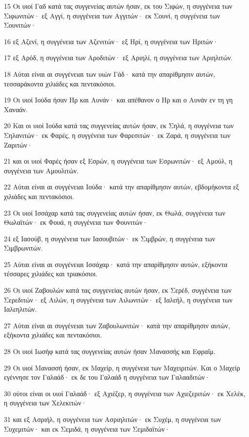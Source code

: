 \par 15 Οι υιοί Γαδ κατά τας συγγενείας αυτών ήσαν, εκ του Σιφών, η συγγένεια των Σιφωνιτών· εξ Αγγί, η συγγένεια των Αγγιτών· εκ Σουνί, η συγγένεια των Σουνιτών·
\par 16 εξ Αζενί, η συγγένεια των Αζενιτών· εξ Ηρί, η συγγένεια των Ηριτών·
\par 17 εξ Αρόδ, η συγγένεια των Αροδιτών· εξ Αριηλί, η συγγένεια των Αριηλιτών.
\par 18 Αύται είναι αι συγγένειαι των υιών Γάδ· κατά την απαρίθμησιν αυτών, τεσσαράκοντα χιλιάδες και πεντακόσιοι.
\par 19 Οι υιοί Ιούδα ήσαν Ηρ και Αυνάν· και απέθανον ο Ηρ και ο Αυνάν εν τη γη Χαναάν.
\par 20 Και οι υιοί Ιούδα κατά τας συγγενείας αυτών ήσαν, εκ Σηλά, η συγγένεια των Σηλανιτών· εκ Φαρές, η συγγένεια των Φαρεσιτών· εκ Ζαρά, η συγγένεια των Ζαριτών·
\par 21 και οι υιοί Φαρές ήσαν εξ Εσρών, η συγγένεια των Εσρωνιτών· εξ Αμούλ, η συγγένεια των Αμουλιτών.
\par 22 Αύται είναι αι συγγένειαι Ιούδα· κατά την απαρίθμησιν αυτών, εβδομήκοντα εξ χιλιάδες και πεντακόσιοι.
\par 23 Οι υιοί Ισσάχαρ κατά τας συγγενείας αυτών ήσαν, εκ Θωλά, συγγένεια των Θωλαϊτών· εκ Φουά, η συγγένεια των Φουνιτών·
\par 24 εξ Ιασούβ, η συγγένεια των Ιασουβιτών· εκ Σιμβρών, η συγγένεια των Σιμβρωνιτών.
\par 25 Αύται είναι αι συγγένειαι Ισσάχαρ· κατά την απαρίθμησιν αυτών, εξήκοντα τέσσαρες χιλιάδες και τριακόσιοι.
\par 26 Οι υιοί Ζαβουλών κατά τας συγγενείας αυτών ήσαν, εκ Σερέδ, συγγένεια των Σερεδιτών· εξ Αιλών, η συγγένεια των Αιλωνιτών· εξ Ιαλεήλ, η συγγένεια των Ιαλεηλιτών.
\par 27 Αύται είναι αι συγγένειαι των Ζαβουλωνιτών· κατά την απαρίθμησιν αυτών, εξήκοντα χιλιάδες και πεντακόσιοι.
\par 28 Οι υιοί Ιωσήφ κατά τας συγγενείας αυτών ήσαν Μανασσής και Εφραΐμ.
\par 29 Οι υιοί Μανασσή ήσαν, εκ Μαχείρ, η συγγένεια των Μαχειριτών. Και ο Μαχείρ εγέννησε τον Γαλαάδ· εκ δε του Γαλαάδ η συγγένεια των Γαλααδιτών·
\par 30 ούτοι είναι οι υιοί Γαλαάδ· εξ Αχιέζερ, η συγγένεια των Αχιεζεριτών· εκ Χελέκ, η συγγένεια των Χελεκιτών·
\par 31 και εξ Ασριήλ, η συγγένεια των Ασριηλιτών· εκ Συχέμ, η συγγένεια των Συχεμιτών· και εκ Σεμιδά, η συγγένεια των Σεμιδαϊτών·
